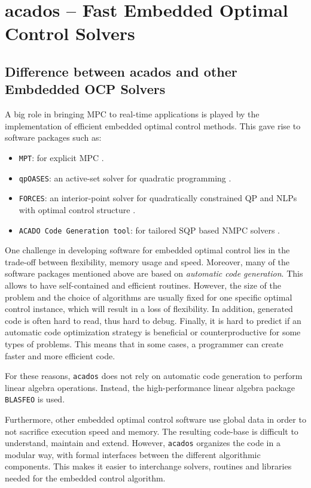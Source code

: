 \documentclass{thesisreport}
\begin{document}
 
 \section{acados – Fast Embedded Optimal Control Solvers}
 
 \subsection{Difference between acados and other Embdedded OCP Solvers}
 A big role in bringing MPC to real-time applications is played by the implementation of efficient embedded optimal control methods. This gave rise to software
packages such as:
    \begin{itemize}
        \item \texttt{MPT}: for explicit MPC \cite{MPT3}.
        \item \texttt{qpOASES}: an active-set solver for quadratic programming \cite{qpOASES}.
        \item \texttt{FORCES}: an interior-point solver for quadratically constrained QP and NLPs with optimal control structure \cite{FORCES}.
        \item \texttt{ACADO Code Generation tool}: for tailored SQP based NMPC solvers \cite{ACADO}.
    \end{itemize}

One challenge in developing software for embedded optimal control lies in the trade-off between flexibility, memory usage and speed. Moreover, many of the software packages mentioned above are based on \textit{automatic code generation}. This allows to have self-contained and efficient routines. However, the size of the problem and the choice of algorithms are usually fixed for one specific optimal control instance, which will result in a loss of flexibility. In addition, generated code is often hard to read, thus hard to debug. Finally, it is hard to predict if an automatic code optimization strategy is beneficial or counterproductive for some types of problems. This means that in some cases, a programmer can create faster and more efficient code.

For these reasons, \texttt{acados} does not rely on automatic code generation to perform linear algebra operations. Instead, the high-performance linear algebra package \texttt{BLASFEO} is used. 

Furthermore, other embedded optimal control software use global data in order to not sacrifice execution speed and memory. The resulting code-base is difficult to understand, maintain and extend. However, \texttt{acados} organizes the code in a modular way, with formal interfaces between the different algorithmic components. This makes it easier to interchange solvers, routines and libraries needed for the embedded control algorithm.
\end{document}
